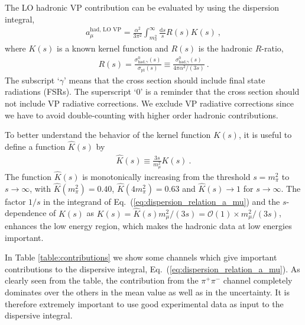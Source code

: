 The LO hadronic VP contribution can be evaluated by using
the dispersion integral,
%
\begin{align}
 a_\mu^{\text{had, LO VP}} =
  \frac{\alpha^2}{3\pi^2} \int_{m_\pi^2}^{\infty}
   \frac{\text{d}s}{s} R(s) K(s)~,
\label{eq:dispersion_relation_a_mu}
\end{align}
%
where $K(s)$ is a known kernel function and
$R(s)$ is the hadronic $R$-ratio,
%
\begin{align}
 R(s) =
  \frac{\sigma^0_{\text{had,} \gamma}(s)}{\sigma_{\text{pt}}(s)}
\equiv
  \frac{\sigma^0_{\text{had,} \gamma}(s)}{4\pi \alpha^2/(3s)}~.
\end{align}
%
The subscript `$\gamma$' means that the cross section
should include final state radiations (FSRs).
The superscript `0' is a reminder that the cross section
should not include VP radiative corrections.  We exclude
VP radiative corrections since we have to avoid
double-counting with higher order hadronic contributions.



To better understand the behavior of the kernel function $K(s)$,
it is useful to define a function $\hat{K}(s)$ by
%
\begin{align}
 \hat{K}(s) \equiv \frac{3s}{m_\mu^2}K(s)~.
\end{align}
%
The function $\hat{K}(s)$ is monotonically increasing
from the threshold $s=m_\pi^2$ to $s \to \infty$, 
with $\hat{K}(m_\pi^2)=0.40$, $\hat{K}(4m_\pi^2)=0.63$
and $\hat{K}(s) \to 1$ for $s \to \infty$.
The factor $1/s$ in the integrand of 
Eq.~(\ref{eq:dispersion_relation_a_mu}) and the
$s$-dependence of $K(s)$ as $K(s)= \hat{K}(s) m_\mu^2/(3s)
= {\mathcal O}(1) \times m_\mu^2/(3s)$,
enhances the low energy region, which makes the 
hadronic data at low energies important.


In Table \ref{table:contributions} we show some channels
which give important contributions to the dispersive
integral, Eq.~(\ref{eq:dispersion_relation_a_mu}). 
As clearly seen from the table, the contribution 
from the $\pi^+\pi^-$ channel completely dominates over
the others in the mean value as well as in the uncertainty.
It is therefore extremely important to use good experimental
data as input to the dispersive integral.


